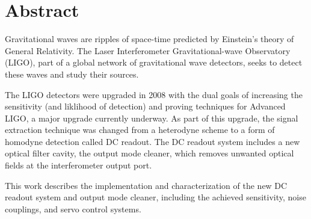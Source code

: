 \chapter*{Abstract}
Gravitational waves are ripples of space-time predicted by Einstein's
theory of General Relativity.  The Laser Interferometer
Gravitational-wave Observatory (LIGO), part of a global network of
gravitational wave detectors, seeks to detect these waves and study
their sources.

The LIGO detectors were upgraded in 2008 with the dual goals of
increasing the sensitivity (and liklihood of detection) and proving
techniques for Advanced LIGO, a major upgrade currently underway.  As
part of this upgrade, the signal extraction technique was changed from
a heterodyne scheme to a form of homodyne detection called DC readout.
The DC readout system includes a new optical filter cavity, the output
mode cleaner, which removes unwanted optical fields at the
interferometer output port.

This work describes the implementation and characterization of the new
DC readout system and output mode cleaner, including the achieved
sensitivity, noise couplings, and servo control systems.

